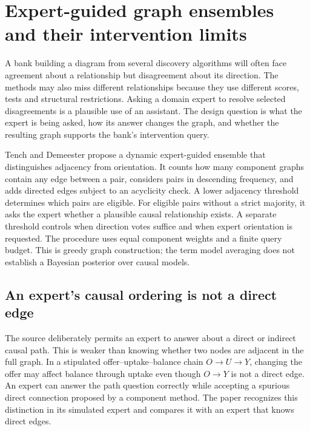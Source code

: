 \section{Expert-guided graph ensembles and their intervention limits}
\label{exec20:expert-scope}

A bank building a diagram from several discovery algorithms will often face
agreement about a relationship but disagreement about its direction. The
methods may also miss different relationships because they use different
scores, tests and structural restrictions. Asking a domain expert to resolve
selected disagreements is a plausible use of an assistant. The design question
is what the expert is being asked, how its answer changes the graph, and whether
the resulting graph supports the bank's intervention query.

Tench and Demeester propose a dynamic expert-guided ensemble that distinguishes
adjacency from orientation. It counts how many component graphs contain any
edge between a pair, considers pairs in descending frequency, and adds directed
edges subject to an acyclicity check. A lower adjacency threshold determines
which pairs are eligible. For eligible pairs without a strict majority, it asks
the expert whether a plausible causal relationship exists. A separate threshold
controls when direction votes suffice and when expert orientation is requested.
The procedure uses equal component weights and a finite query budget. This is
greedy graph construction; the term model averaging does not establish a
Bayesian posterior over causal models. \citep{exec20_expert_averaging}

\subsection{An expert's causal ordering is not a direct edge}
\label{exec20:expert-semantics}

The source deliberately permits an expert to answer about a direct or indirect
causal path. This is weaker than knowing whether two nodes are adjacent in the
full graph. In a stipulated offer--uptake--balance chain
$O\rightarrow U\rightarrow Y$, changing the offer may affect balance through
uptake even though $O\rightarrow Y$ is not a direct edge. An expert can answer
the path question correctly while accepting a spurious direct connection
proposed by a component method. The paper recognizes this distinction in its
simulated expert and compares it with an expert that knows direct edges.
\citep{exec20_expert_averaging,exec20_expert_averaging_reference}

